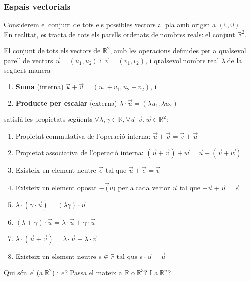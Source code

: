 \documentclass{beamer}
\begin{document}
\begin{frame}
\frametitle{Espais vectorials}

Considerem el conjunt de tots els possibles vectors al pla amb origen a $(0,0)$. En realitat, es tracta de tots els parells ordenats de nombres reals: el conjunt $\mathbb{R}^2$.

El conjunt de tots els vectors de $\mathbb{R}^2$, amb les operacions definides per a qualsevol parell de vectors $\vec{u}=(u_1,u_2)$ i $\vec{v}=(v_1,v_2)$, i qualsevol nombre real $\lambda$ de la següent manera
\begin{enumerate}
\item {\bf Suma} (interna) $\vec{u}+\vec{v}=(u_1+v_1,u_2+v_2)$, i
\item {\bf Producte per escalar} (externa) $\lambda \cdot \vec{u} = (\lambda u_1, \lambda u_2)$
\end{enumerate}
satisfà les propietats següents $\forall \lambda, \gamma \in \mathbb{R}  , \forall \vec{u}, \vec{v},\vec{w}\in \mathbb{R}^2$:

\end{frame}
\begin{frame}
  \begin{enumerate}
    \item Propietat commutativa de l'operació interna: $\vec{u}+\vec{v}=\vec{v}+\vec{u}$
    \item Propietat associativa de l'operació interna: $(\vec{u}+\vec{v})+\vec{w}= \vec{u}+(\vec{v}+\vec{w})$
    \item Existeix un element neutre $\vec{e}$ tal que $\vec{u}+\vec{e}=\vec{u}$
    \item Existeix un element oposat $-\vec(u)$ per a cada vector $\vec{u}$ tal que $-\vec{u}+\vec{u}=\vec{e}$
    \item $\lambda \cdot (\gamma \cdot \vec{u})=(\lambda \gamma) \cdot \vec{u}$
    \item $(\lambda + \gamma) \cdot \vec{u} = \lambda \cdot \vec{u} + \gamma \cdot \vec{u}$
    \item $\lambda \cdot (\vec{u}+\vec{v}) = \lambda \cdot \vec{u} + \lambda \cdot \vec{v}$
    \item Existeix un element neutre $e \in \mathbb{R}$ tal que $e \cdot \vec{u} = \vec{u}$

  \end{enumerate}
Qui són $\vec{e}$ (a $\mathbb{R}^2$) i $e$? Passa el mateix a $\mathbb{R}$ o $\mathbb{R}^3$? I a $\mathbb{R}^n$?
\end{frame}
\end{document}
